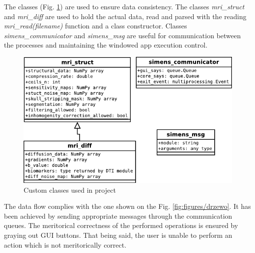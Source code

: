 The classes (Fig. \ref{Fig:classes}) are used to ensure data consistency. The classes \textit{mri\_struct} and \textit{mri\_diff} are used to hold the actual data, read and parsed with the reading \textit{mri\_read(filename)} function and a class constructor. Classes \textit{simens\_communicator} and \textit{simens\_msg} are useful for communication between the processes and maintaining the windowed app execution control.

\begin{figure}
\centering
\includegraphics[scale=1]{figures/classes}

\caption[Classes scheme]{\label{Fig:classes}Custom classes used in project}
\end{figure}

The data flow complies with the one shown on the Fig. \ref{fig:figures/drzewo}. It has been achieved by sending appropriate messages through the communication queues. The meritorical correctness of the performed operations is ensured by graying out GUI buttons. That being said, the user is unable to perform an action which is not meritorically correct.